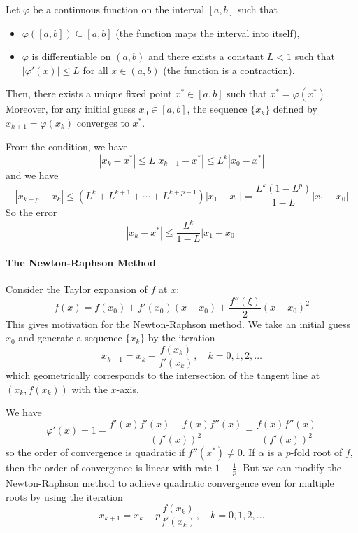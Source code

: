 \documentclass{matharticle}
\begin{document}
\begin{theorem}
	Let $\varphi$ be a continuous function on the interval $[a, b]$ such that
	\begin{itemize}
		\item $\varphi([a, b]) \subseteq [a, b]$ (the function maps the interval into itself),
		\item $\varphi$ is differentiable on $(a, b)$ and there exists a constant $L < 1$ such that $|\varphi'(x)| \leq L$ for all $x \in (a, b)$ (the function is a contraction).
	\end{itemize}
	Then, there exists a unique fixed point $x^* \in [a, b]$ such that $x^* = \varphi(x^*)$. Moreover, for any initial guess $x_0 \in [a, b]$, the sequence $\{x_k\}$ defined by $x_{k+1} = \varphi(x_k)$ converges to $x^*$.
\end{theorem}
From the condition, we have
\begin{equation*}
	|x_k - x^*| \leq L |x_{k-1} - x^*| \leq L^k |x_0 - x^*|
\end{equation*}
and we have
\begin{equation*}
	|x_{k+p} - x_k| \leq (L^k + L^{k+1} + \cdots + L^{k+p-1}) |x_1 - x_0| = \frac{L^k (1 - L^p)}{1 - L} |x_1 - x_0|
\end{equation*}
So the error
\begin{equation}
	|x_k - x^*| \leq \frac{L^k}{1 - L} |x_1 - x_0|
\end{equation}

\paragraph{The Newton-Raphson Method}
Consider the Taylor expansion of $f$ at $x$:
\begin{equation}
	f(x) = f(x_0) + f'(x_0)(x - x_0) + \frac{f''(\xi)}{2} (x - x_0)^2
\end{equation}
This gives motivation for the Newton-Raphson method. We take an initial guess $x_0$ and generate a sequence $\{x_k\}$ by the iteration
\begin{equation}
	x_{k+1} = x_k - \frac{f(x_k)}{f'(x_k)}, \quad k = 0, 1, 2, \ldots
\end{equation}
which geometrically corresponds to the intersection of the tangent line at $(x_k, f(x_k))$ with the $x$-axis.

We have
\begin{equation*}
	\varphi'(x) = 1 - \frac{f'(x) f'(x) - f(x) f''(x)}{(f'(x))^2} = \frac{f(x) f''(x)}{(f'(x))^2}
\end{equation*}
so the order of convergence is quadratic if $f''(x^*) \neq 0$. If $\alpha$ is a $p$-fold root of $f$, then the order of convergence is linear with rate $1 - \frac{1}{p}$. But we can modify the Newton-Raphson method to achieve quadratic convergence even for multiple roots by using the iteration
\begin{equation}
	x_{k+1} = x_k - p \frac{f(x_k)}{f'(x_k)}, \quad k = 0, 1, 2, \ldots
\end{equation}
\end{document}

